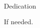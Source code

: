 \vspace{.65in}

\renewcommand{\baselinestretch}{2}
\small\normalsize
\hbox{\ }

\vspace*{-.85in}


\begin{center}
\large{Dedication}
\end{center}

If needed.
